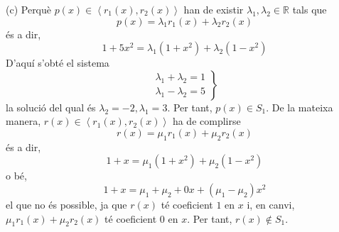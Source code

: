 \begin{solucio}
(c) Perquè $p(x)\in \left\langle r_{1}(x),r_{2}(x)\right\rangle $ han de
existir $\lambda _{1},\lambda _{2}\in \mathbb{R}$ tals que%
\begin{equation*}
p(x)=\lambda _{1}r_{1}(x)+\lambda _{2}r_{2}(x)
\end{equation*}%
és a dir,%
\begin{equation*}
1+5x^{2}=\lambda _{1}(1+x^{2})+\lambda _{2}(1-x^{2})
\end{equation*}%
D’aquí s’obté el sistema%
\begin{equation*}
\left.
\begin{array}{r}
\lambda _{1}+\lambda _{2}=1 \\
\lambda _{1}-\lambda _{2}=5%
\end{array}%
\right\}
\end{equation*}%
la solució del qual és $\lambda _{2}=-2,\lambda _{1}=3$. Per tant, $p(x)\in
S_{1}$. De la mateixa manera, $r(x)\in \left\langle
r_{1}(x),r_{2}(x)\right\rangle $ ha de complirse%
\begin{equation*}
r(x)=\mu _{1}r_{1}(x)+\mu _{2}r_{2}(x)
\end{equation*}%
és a dir,%
\begin{equation*}
1+x=\mu _{1}(1+x^{2})+\mu _{2}(1-x^{2})
\end{equation*}%
o bé,%
\begin{equation*}
1+x=\mu _{1}+\mu _{2}+0x+(\mu _{1}-\mu _{2})x^{2}
\end{equation*}%
el que no és possible, ja que $r(x)$ té coeficient $1$ en $x$ i, en
canvi, $\mu _{1}r_{1}(x)+\mu _{2}r_{2}(x)$ té coeficient $0$ en $x$.
Per tant, $r(x)\notin S_{1}$.


\end{solucio}
